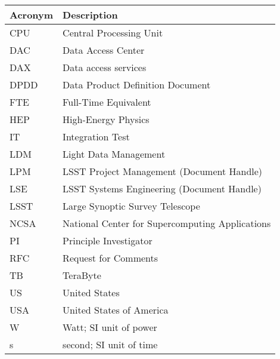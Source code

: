 \addtocounter{table}{-1}
\begin{longtable}{|l|p{}|}\hline
\textbf{Acronym} & \textbf{Description}  \\\hline

CPU&Central Processing Unit \\\hline
DAC&Data Access Center \\\hline
DAX&Data access services \\\hline
DPDD&Data Product Definition Document \\\hline
FTE&Full-Time Equivalent \\\hline
HEP&High-Energy Physics \\\hline
IT&Integration Test \\\hline
LDM&Light Data Management \\\hline
LPM&LSST Project Management (Document Handle) \\\hline
LSE&LSST Systems Engineering (Document Handle) \\\hline
LSST&Large Synoptic Survey Telescope \\\hline
NCSA&National Center for Supercomputing Applications \\\hline
PI&Principle Investigator \\\hline
RFC&Request for Comments \\\hline
TB&TeraByte \\\hline
US&United States \\\hline
USA&United States of America \\\hline
W&Watt; SI unit of power \\\hline
s&second; SI unit of time \\\hline
\end{longtable}

